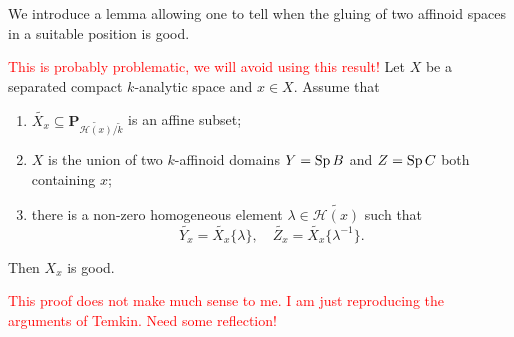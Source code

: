 We introduce a lemma allowing one to tell when the gluing of two affinoid spaces in a suitable position is good.
\begin{lemma}\label{lma-glueaffinetogood} \textcolor{red}{This is probably problematic, we will avoid using this result!}
    Let $X$ be a separated compact $k$-analytic space and $x\in X$. Assume that
    \begin{enumerate}
        \item $\widetilde{X_x}\subseteq \mathbf{P}_{\widetilde{\mathscr{H}(x)}/\tilde{k}}$ is an affine subset;
        \item $X$ is the union of two $k$-affinoid domains $Y=\operatorname{Sp} B$ and $Z=\operatorname{Sp} C$ both containing $x$;
        \item there is a non-zero homogeneous element $\lambda\in \widetilde{\mathscr{H}(x)}$ such that
        \[
            \widetilde{Y_x}=\widetilde{X_x}\{\lambda\},\quad   \widetilde{Z_x}=\widetilde{X_x}\{\lambda^{-1}\}.
        \]
    \end{enumerate}
    Then $X_x$ is good.
\end{lemma}

\textcolor{red}{This proof does not make much sense to me. I am just reproducing the arguments of Temkin. Need some reflection!}


